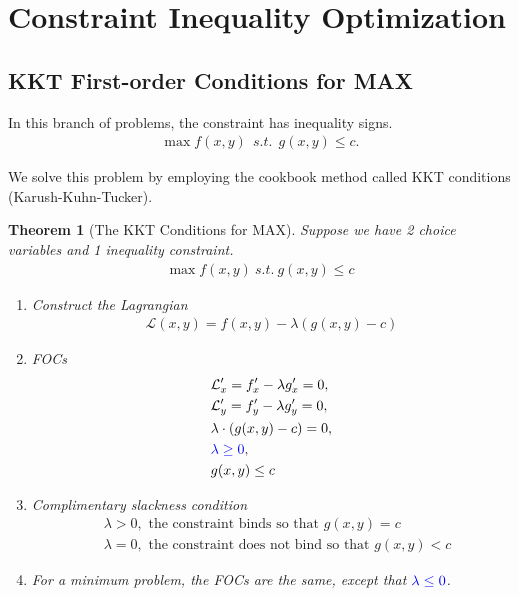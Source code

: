 \documentclass[11pt,a4paper]{book}
\newcommand{\blue}[1]{\textcolor{blue}{#1}}
\newtheorem{theorem}{Theorem}[section]
\theoremstyle{definition}\newtheorem{definition}{Definition}
\theoremstyle{definition}\newtheorem{fact}{Fact}
\theoremstyle{definition}\newtheorem{remark}{Remark}
\theoremstyle{definition}\newtheorem{ex}{Ex.}
\theoremstyle{definition}\newtheorem{project}{Project}
\theoremstyle{definition}\newtheorem{problem}{Problem}
\theoremstyle{definition}\newtheorem{example}{Example}
\newenvironment{ftheorem}
{\begin{mdframed}\begin{theorem}}
		{\end{theorem}\end{mdframed}}
\numberwithin{theorem}{section}
\numberwithin{corollary}{chapter}
\numberwithin{assumption}{chapter}
\numberwithin{definition}{chapter}
\numberwithin{prop}{chapter}
\numberwithin{notation}{chapter}
\numberwithin{problem}{chapter}
\numberwithin{example}{chapter}
\numberwithin{fact}{chapter}
\numberwithin{ex}{chapter}
\begin{document}
	
	\section{Constraint Inequality Optimization}
	\subsection{KKT First-order Conditions for MAX}
	In this branch of problems, the constraint has inequality signs.
	\begin{align*}
		\max f(x,y) \ \ s.t. \ \ g(x,y) \leq c. 
	\end{align*}
	
	We solve this problem by employing the cookbook method called KKT conditions (Karush-Kuhn-Tucker).
	
	\begin{ftheorem}[The KKT Conditions for MAX]
		Suppose we have 2 choice variables and 1 inequality constraint.
		\begin{align*}
			\max f(x,y)  \ s.t. \ g(x,y) \leq c 
		\end{align*}
		\begin{enumerate}
			\item Construct the Lagrangian
			\begin{align*}
				\mathcal{L} (x,y) = f(x,y) - \lambda (g(x,y) - c) 
			\end{align*}
			\item FOCs
			\begin{align*}
				& \mathcal{L}'_x = f'_x - \lambda g'_x = 0, \\
				& \mathcal{L}'_y = f'_y - \lambda g'_y = 0, \\
				& \lambda \cdot ( g(x,y) - c) = 0,                \\
				& \blue{\lambda \geq 0},                    \\
				& g(x,y) \leq c                             
			\end{align*}
			\item Complimentary slackness condition
			\begin{align*}
				& \lambda > 0, \text{ the constraint binds so that $g(x,y) =c$}          \\
				& \lambda = 0, \text{ the constraint does not bind so that $g(x,y) < c$}
			\end{align*}
			\item For a minimum problem, the FOCs are the same, except that $\blue{\lambda \leq 0}$.
		\end{enumerate}
	\end{ftheorem}
	
\end{document}
